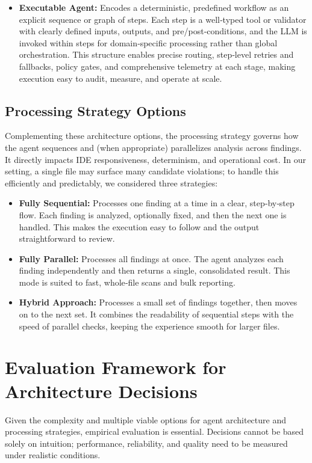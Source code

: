 \begin{spacing}{1.2}
\begin{itemize}
    \item \textbf{Executable Agent:} Encodes a deterministic, predefined workflow as an explicit sequence or graph of steps. Each step is a well‑typed tool or validator with clearly defined inputs, outputs, and pre/post‑conditions, and the LLM is invoked within steps for domain‑specific processing rather than global orchestration. This structure enables precise routing, step‑level retries and fallbacks, policy gates, and comprehensive telemetry at each stage, making execution easy to audit, measure, and operate at scale.
\end{itemize}

\subsection{Processing Strategy Options}
Complementing these architecture options, the processing strategy governs how the agent sequences and (when appropriate) parallelizes analysis across findings. It directly impacts IDE responsiveness, determinism, and operational cost. In our setting, a single file may surface many candidate violations; to handle this efficiently and predictably, we considered three strategies:

\begin{itemize}
    \item \textbf{Fully Sequential:} Processes one finding at a time in a clear, step‑by‑step flow. Each finding is analyzed, optionally fixed, and then the next one is handled. This makes the execution easy to follow and the output straightforward to review.
    
    \item \textbf{Fully Parallel:} Processes all findings at once. The agent analyzes each finding independently and then returns a single, consolidated result. This mode is suited to fast, whole‑file scans and bulk reporting.
    
    \item \textbf{Hybrid Approach:} Processes a small set of findings together, then moves on to the next set. It combines the readability of sequential steps with the speed of parallel checks, keeping the experience smooth for larger files.
\end{itemize}

\section{Evaluation Framework for Architecture Decisions}
Given the complexity and multiple viable options for agent architecture and processing strategies, empirical evaluation is essential. Decisions cannot be based solely on intuition; performance, reliability, and quality need to be measured under realistic conditions.


\end{spacing}
